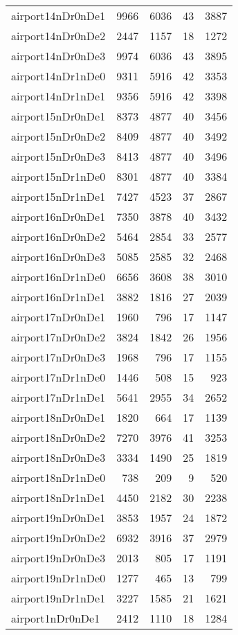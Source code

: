 \begin{longtable}{lrrrr}
airport14nDr0nDe1 & 9966 & 6036 & 43 & 3887 \\
airport14nDr0nDe2 & 2447 & 1157 & 18 & 1272 \\
airport14nDr0nDe3 & 9974 & 6036 & 43 & 3895 \\
airport14nDr1nDe0 & 9311 & 5916 & 42 & 3353 \\
airport14nDr1nDe1 & 9356 & 5916 & 42 & 3398 \\
airport15nDr0nDe1 & 8373 & 4877 & 40 & 3456 \\
airport15nDr0nDe2 & 8409 & 4877 & 40 & 3492 \\
airport15nDr0nDe3 & 8413 & 4877 & 40 & 3496 \\
airport15nDr1nDe0 & 8301 & 4877 & 40 & 3384 \\
airport15nDr1nDe1 & 7427 & 4523 & 37 & 2867 \\
airport16nDr0nDe1 & 7350 & 3878 & 40 & 3432 \\
airport16nDr0nDe2 & 5464 & 2854 & 33 & 2577 \\
airport16nDr0nDe3 & 5085 & 2585 & 32 & 2468 \\
airport16nDr1nDe0 & 6656 & 3608 & 38 & 3010 \\
airport16nDr1nDe1 & 3882 & 1816 & 27 & 2039 \\
airport17nDr0nDe1 & 1960 & 796 & 17 & 1147 \\
airport17nDr0nDe2 & 3824 & 1842 & 26 & 1956 \\
airport17nDr0nDe3 & 1968 & 796 & 17 & 1155 \\
airport17nDr1nDe0 & 1446 & 508 & 15 & 923 \\
airport17nDr1nDe1 & 5641 & 2955 & 34 & 2652 \\
airport18nDr0nDe1 & 1820 & 664 & 17 & 1139 \\
airport18nDr0nDe2 & 7270 & 3976 & 41 & 3253 \\
airport18nDr0nDe3 & 3334 & 1490 & 25 & 1819 \\
airport18nDr1nDe0 & 738 & 209 & 9 & 520 \\
airport18nDr1nDe1 & 4450 & 2182 & 30 & 2238 \\
airport19nDr0nDe1 & 3853 & 1957 & 24 & 1872 \\
airport19nDr0nDe2 & 6932 & 3916 & 37 & 2979 \\
airport19nDr0nDe3 & 2013 & 805 & 17 & 1191 \\
airport19nDr1nDe0 & 1277 & 465 & 13 & 799 \\
airport19nDr1nDe1 & 3227 & 1585 & 21 & 1621 \\
airport1nDr0nDe1 & 2412 & 1110 & 18 & 1284 \\

\end{longtable}

